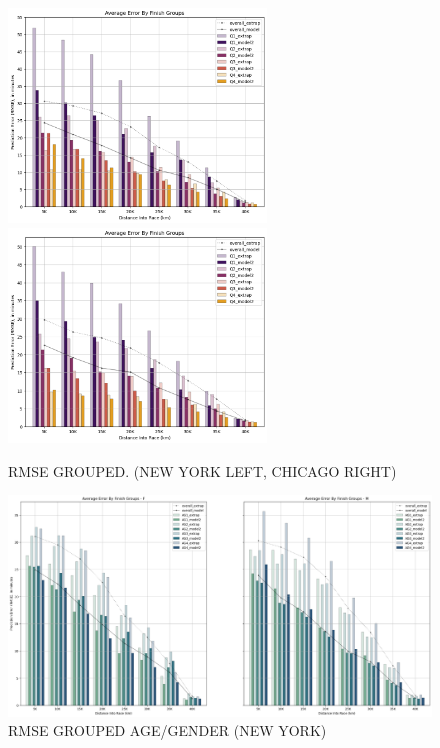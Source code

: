 \documentclass[USenglish,twocolumn]{article}
\theoremstyle{dgthm}
\theoremstyle{dgdef}
\begin{document}
\begin{figure}[ht]
    \centering
    \includegraphics[width=2.7in]{../analysis/nyc_rmse_groups.png}
    \includegraphics[width=2.7in]{../analysis/chi_rmse_groups.png}
    \caption{RMSE GROUPED. (NEW YORK LEFT, CHICAGO RIGHT)}
\end{figure}

\begin{figure}[ht]
    \centering
    \includegraphics[width=6.2in]{../analysis/nyc_rmse_gender_age.png}
    \caption{RMSE  GROUPED AGE/GENDER (NEW YORK)}
     \label{fig:breakdown}
\end{figure}
\end{document}
